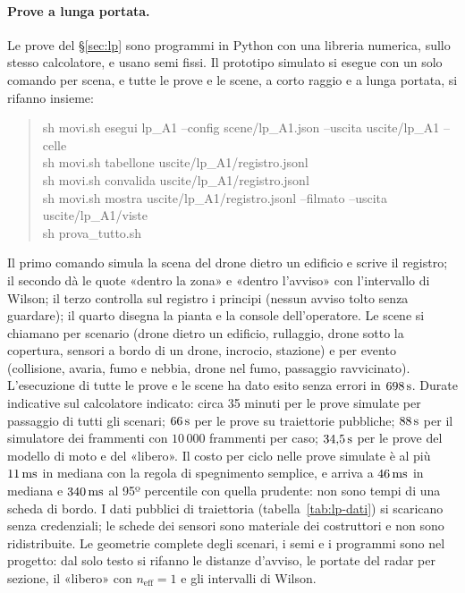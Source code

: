 \paragraph{Prove a lunga portata.} Le prove del \S\ref{sec:lp} sono programmi in Python con una libreria numerica, sullo stesso calcolatore, e usano semi fissi. Il prototipo simulato si esegue con un solo comando per scena, e tutte le prove e le scene, a corto raggio e a lunga portata, si rifanno insieme:
\begin{quote}\small\ttfamily
sh movi.sh esegui lp\_A1 --config scene/lp\_A1.json --uscita uscite/lp\_A1 --celle\\
sh movi.sh tabellone uscite/lp\_A1/registro.jsonl\\
sh movi.sh convalida uscite/lp\_A1/registro.jsonl\\
sh movi.sh mostra uscite/lp\_A1/registro.jsonl --filmato --uscita uscite/lp\_A1/viste\\
sh prova\_tutto.sh
\end{quote}
Il primo comando simula la scena del drone dietro un edificio e scrive il registro; il secondo dà le quote «dentro la zona» e «dentro l'avviso» con l'intervallo di Wilson; il terzo controlla sul registro i principi (nessun avviso tolto senza guardare); il quarto disegna la pianta e la console dell'operatore. Le scene si chiamano per scenario (drone dietro un edificio, rullaggio, drone sotto la copertura, sensori a bordo di un drone, incrocio, stazione) e per evento (collisione, avaria, fumo e nebbia, drone nel fumo, passaggio ravvicinato). L'esecuzione di tutte le prove e le scene ha dato esito senza errori in $698\,\mathrm{s}$. Durate indicative sul calcolatore indicato: circa 35 minuti per le prove simulate per passaggio di tutti gli scenari; $66\,\mathrm{s}$ per le prove su traiettorie pubbliche; $88\,\mathrm{s}$ per il simulatore dei frammenti con $10\,000$ frammenti per caso; $34{,}5\,\mathrm{s}$ per le prove del modello di moto e del «libero». Il costo per ciclo nelle prove simulate è al più $11\,\mathrm{ms}$ in mediana con la regola di spegnimento semplice, e arriva a $46\,\mathrm{ms}$ in mediana e $340\,\mathrm{ms}$ al 95º percentile con quella prudente: non sono tempi di una scheda di bordo. I dati pubblici di traiettoria (tabella~\ref{tab:lp-dati}) si scaricano senza credenziali; le schede dei sensori sono materiale dei costruttori e non sono ridistribuite. Le geometrie complete degli scenari, i semi e i programmi sono nel progetto: dal solo testo si rifanno le distanze d'avviso, le portate del radar per sezione, il «libero» con $n_{\mathrm{eff}}=1$ e gli intervalli di Wilson.

